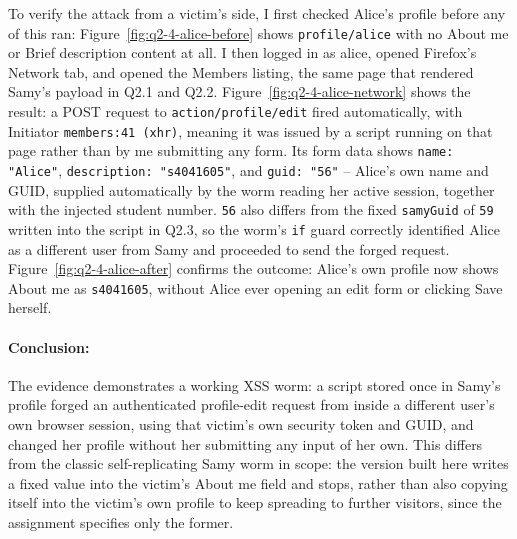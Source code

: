 To verify the attack from a victim's side, I first checked Alice's profile before any of this ran: Figure~\ref{fig:q2-4-alice-before} shows \texttt{profile/alice} with no About me or Brief description content at all. I then logged in as alice, opened Firefox's Network tab, and opened the Members listing, the same page that rendered Samy's payload in Q2.1 and Q2.2. Figure~\ref{fig:q2-4-alice-network} shows the result: a POST request to \texttt{action/profile/edit} fired automatically, with Initiator \texttt{members:41 (xhr)}, meaning it was issued by a script running on that page rather than by me submitting any form. Its form data shows \texttt{name: "Alice"}, \texttt{description: "s4041605"}, and \texttt{guid: "56"} -- Alice's own name and GUID, supplied automatically by the worm reading her active session, together with the injected student number. \texttt{56} also differs from the fixed \texttt{samyGuid} of \texttt{59} written into the script in Q2.3, so the worm's \texttt{if} guard correctly identified Alice as a different user from Samy and proceeded to send the forged request. Figure~\ref{fig:q2-4-alice-after} confirms the outcome: Alice's own profile now shows About me as \texttt{s4041605}, without Alice ever opening an edit form or clicking Save herself.






\paragraph{Conclusion:} The evidence demonstrates a working XSS worm: a script stored once in Samy's profile forged an authenticated profile-edit request from inside a different user's own browser session, using that victim's own security token and GUID, and changed her profile without her submitting any input of her own. This differs from the classic self-replicating Samy worm in scope: the version built here writes a fixed value into the victim's About me field and stops, rather than also copying itself into the victim's own profile to keep spreading to further visitors, since the assignment specifies only the former.
